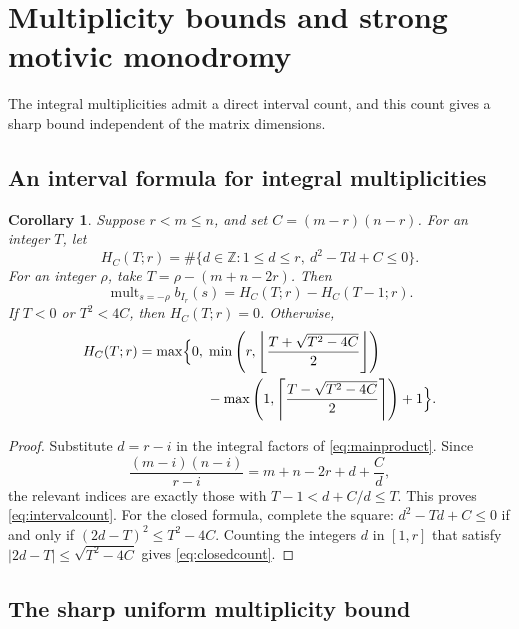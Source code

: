 \documentclass[11pt,a4paper]{article}
\numberwithin{equation}{section}
\newtheorem{corollary}[theorem]{Corollary}
\theoremstyle{definition}
\newcommand{\Z}{\mathbb Z}
\DeclareMathOperator{\mult}{mult}
\begin{document}
\section{Multiplicity bounds and strong motivic monodromy}\label{sec:arithmetic}

The integral multiplicities admit a direct interval count, and this
count gives a sharp bound independent of the matrix dimensions.

\subsection{An interval formula for integral multiplicities}\label{subsec:interval}

\begin{corollary}\label{cor:interval}
Suppose $r<m\le n$, and set $C=(m-r)(n-r)$. For an integer $T$, let
\[
H_C(T;r)=\#\{d\in\Z:1\le d\le r,\ d^2-Td+C\le0\}.
\]
For an integer $\rho$, take $T=\rho-(m+n-2r)$. Then
\begin{equation}\label{eq:intervalcount}
\mult_{s=-\rho}b_{I_r}(s)=H_C(T;r)-H_C(T-1;r).
\end{equation}
If $T<0$ or $T^2<4C$, then $H_C(T;r)=0$. Otherwise,
\begin{equation}\label{eq:closedcount}
\begin{aligned}
H_C(T;r)=\max\Bigl\{0,\;&
\min\left(r,\left\lfloor\frac{T+\sqrt{T^2-4C}}{2}\right\rfloor\right)\\
&-\max\left(1,\left\lceil\frac{T-\sqrt{T^2-4C}}{2}\right\rceil\right)+1\Bigr\}.
\end{aligned}
\end{equation}
\end{corollary}
\begin{proof}
Substitute $d=r-i$ in the integral factors of
\eqref{eq:mainproduct}. Since
\[
\frac{(m-i)(n-i)}{r-i}=m+n-2r+d+\frac{C}{d},
\]
the relevant indices are exactly those with
$T-1<d+C/d\le T$. This proves \eqref{eq:intervalcount}.
For the closed formula, complete the square:
$d^2-Td+C\le0$ if and only if
$(2d-T)^2\le T^2-4C$. Counting the integers $d$ in $[1,r]$ that
satisfy $|2d-T|\le\sqrt{T^2-4C}$ gives \eqref{eq:closedcount}.
\end{proof}

\subsection{The sharp uniform multiplicity bound}\label{subsec:sharp}
\end{document}
